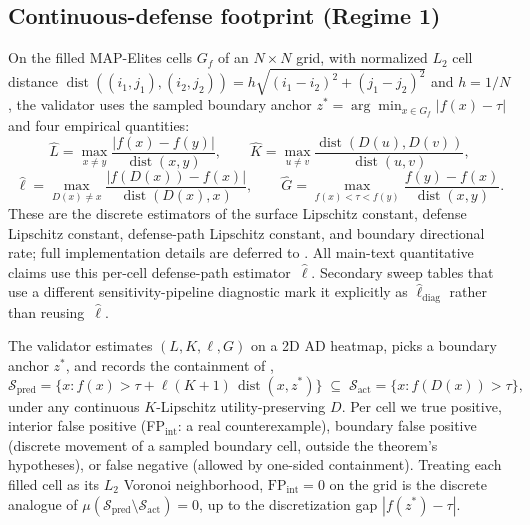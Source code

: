 \documentclass[11pt]{article}
\newcommand{\dist}{\operatorname{dist}}
\begin{document}
\subsection{Continuous-defense footprint (Regime 1)}
\label{sec:continuous-regime}
\label{sec:live-validation}

On the filled MAP-Elites cells $G_f$ of an $N\times N$ grid, with
normalized $L_2$ cell distance
$\dist((i_1,j_1),(i_2,j_2)) = h\sqrt{(i_1-i_2)^2 + (j_1-j_2)^2}$ and
$h=1/N$, the validator uses the sampled boundary anchor
$z^*=\arg\min_{x\in G_f}|f(x)-\tau|$ and four empirical quantities:
\[
\hat L=\max_{x\neq y}\frac{|f(x)-f(y)|}{\dist(x,y)},\qquad
\hat K=\max_{u\neq v}\frac{\dist(D(u),D(v))}{\dist(u,v)},
\]
\[
\hat\ell=\max_{D(x)\neq x}\frac{|f(D(x))-f(x)|}{\dist(D(x),x)},\qquad
\hat G=\max_{f(x)<\tau<f(y)}\frac{f(y)-f(x)}{\dist(x,y)}.
\]
These are the discrete estimators of the surface Lipschitz constant,
defense Lipschitz constant, defense-path Lipschitz constant, and
boundary directional rate; full implementation details are deferred to
.
All main-text quantitative claims use this per-cell defense-path
estimator~$\hat\ell$. Secondary sweep tables that use a different
sensitivity-pipeline diagnostic mark it explicitly as
$\hat\ell_{\mathrm{diag}}$ rather than reusing~$\hat\ell$.

The validator estimates $(L, K, \ell, G)$ on a 2D AD heatmap, picks a
boundary anchor $z^{*}$, and records the containment of
,
\[
\mathcal{S}_{\text{pred}} = \{x : f(x) > \tau + \ell(K{+}1)\,\dist(x,z^*)\}
\;\subseteq\;
\mathcal{S}_{\text{act}} = \{x : f(D(x)) > \tau\},
\]
under any continuous $K$-Lipschitz utility-preserving $D$. Per cell we
true positive, interior false positive
(FP$_{\mathrm{int}}$: a real counterexample), boundary false positive
(discrete movement of a sampled boundary cell, outside the theorem's
hypotheses), or false negative (allowed by one-sided containment).
Treating each filled cell as its $L_2$ Voronoi neighborhood,
$\mathrm{FP}_{\mathrm{int}}=0$ on the grid is the discrete analogue of
$\mu(\mathcal{S}_{\text{pred}}\setminus\mathcal{S}_{\text{act}})=0$,
up to the discretization gap $|f(z^*)-\tau|$.
\end{document}
